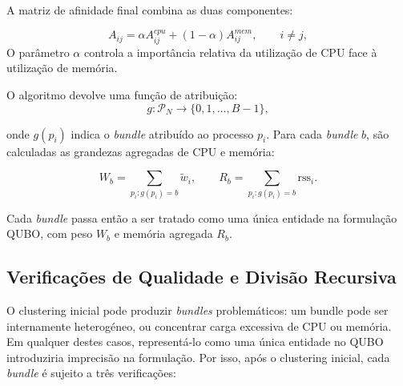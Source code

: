 A matriz de afinidade final combina as duas componentes:

\begin{equation}
    A_{ij} = \alpha A^{cpu}_{ij} + (1-\alpha) A^{mem}_{ij}, \qquad i \neq j,
\end{equation}
O parâmetro $\alpha$ controla a 
importância relativa da utilização de \acs{CPU} face à utilização de memória.

O algoritmo devolve uma função de atribuição:
\begin{equation}
    g : \mathcal{P}_{N} \rightarrow \{0, 1, \dots, B-1\},
\end{equation}

onde $g(p_i)$ indica o \textit{bundle} atribuído ao processo $p_i$. Para cada 
\textit{bundle} $b$, são calculadas as grandezas agregadas de \acs{CPU} e memória:

\begin{equation}
    W_b = \sum_{p_i : g(p_i)=b} \tilde{w}_i,
    \qquad
    R_b = \sum_{p_i : g(p_i)=b} \mathrm{rss}_i.
\end{equation}

Cada \textit{bundle} passa então a ser tratado como uma única entidade na 
formulação \acs{QUBO}, com peso $W_b$ e memória agregada $R_b$.


\subsection{Verificações de Qualidade e Divisão Recursiva}

O clustering inicial pode produzir \textit{bundles} problemáticos: um bundle pode
ser internamente heterogéneo, ou concentrar carga excessiva de \acs{CPU} ou memória. Em qualquer destes casos, representá-lo como uma 
única entidade no \acs{QUBO} introduziria imprecisão na formulação. Por isso, após 
o clustering inicial, cada \textit{bundle} é sujeito a três verificações:


